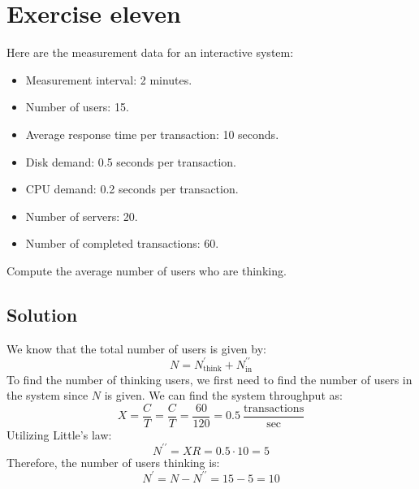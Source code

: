 \section{Exercise eleven}

Here are the measurement data for an interactive system:
\begin{itemize}
    \item Measurement interval: 2 minutes.
    \item Number of users: 15.
    \item Average response time per transaction: 10 seconds.
    \item Disk demand: 0.5 seconds per transaction.
    \item CPU demand: 0.2 seconds per transaction.
    \item Number of servers: 20.
    \item Number of completed transactions: 60.
\end{itemize}
Compute the average number of users who are thinking. 

\subsection*{Solution}
We know that the total number of users is given by:
\[N=N^{\prime}_{\text{think}}+N^{\prime\prime}_{\text{in}}\]
To find the number of thinking users, we first need to find the number of users in the system since $N$ is given. 
We can find the system throughput as:
\[X=\dfrac{C}{T}=\dfrac{C}{T}=\dfrac{60}{120}=0.5\:\dfrac{\text{transactions}}{\text{sec}}\]
Utilizing Little's law:
\[N^{\prime\prime}=XR=0.5\cdot 10=5\]
Therefore, the number of users thinking is:
\[N^{\prime}=N-N^{\prime\prime}=15-5=10\]